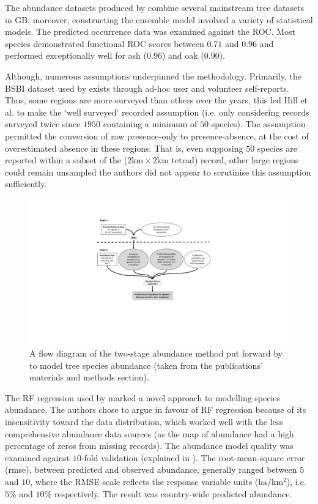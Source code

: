 The abundance datasets produced by \cite{hill.data} combine several mainstream tree datasets in GB; moreover, 
constructing the ensemble model involved a variety of statistical models.
The predicted occurrence data was examined against the ROC.
Most species demonstrated functional ROC scores between $0.71$ and $0.96$ and performed exceptionally
well for ash ($0.96$) and oak ($0.90$).  

Although, numerous assumptions underpinned the methodology.
Primarily, the BSBI dataset used by \cite{hill.data} exists through ad-hoc user and volunteer self-reports.
Thus, some regions are more surveyed than others over the years, this led Hill et al. to make the 
`well surveyed' recorded assumption (i.e. only considering records surveyed twice since $1950$ containing a minimum of $50$ species).
The assumption permitted the conversion of raw presence-only to presence-absence, 
at the cost of overestimated absence in these regions. That is, even supposing $50$ species
are reported within a subset of the ($\mathrm{2km \times 2km}$ tetrad) record, other large regions could remain unsampled\textemdash
the authors did not appear to scrutinise this assumption sufficiently.

\begin{figure}
    \centering
    \includegraphics[scale=0.55]{chapter2/figures/hill-method-fig.pdf}
    \caption{A flow diagram of the two-stage abundance method put forward by \cite{hill.data} to model tree species abundance  
    (taken from the publications' materials and methods section).}
    \label{fig:hill-method}
\end{figure}

The RF regression used by \cite{hill.data} marked a novel approach to modelling species abundance.
The authors chose to argue in favour of RF regression because of its insensitivity toward the data distribution,
which worked well with the less comprehensive abundance data sources (as the map of abundance had a high percentage of zeros from missing records).
The abundance model quality was examined against $10$-fold validation (explained in \cite{refaeilzadeh2009cross}).
The root-mean-square error (\acrshort{rmse}), between predicted and observed abundance, generally ranged between $5$ and $10$,
where the RMSE scale reflects the response variable units ($\mathrm{ha/km^2}$), i.e. $5\%$ and $10\%$ respectively.
The result was country-wide predicted abundance.

